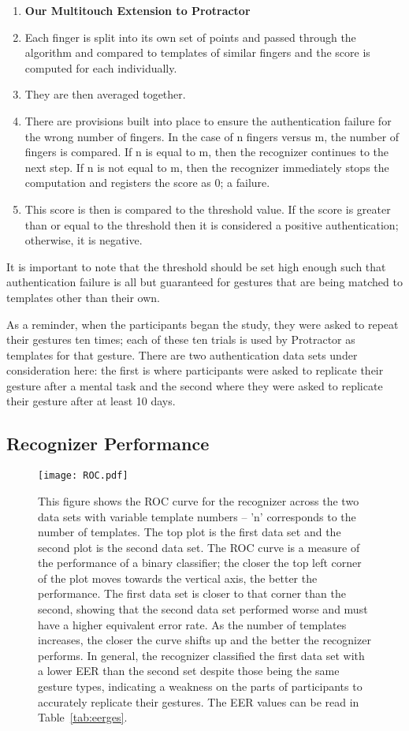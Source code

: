 \documentclass{sig-alternate-10pt}
\begin{document}
\begin{enumerate}
\item[] \textbf{Our Multitouch Extension to Protractor}
\item  Each finger is split into its own set of points and passed through the algorithm and compared to templates of similar fingers and the score is computed for each individually. 
\item They are then averaged together.
\item There are provisions built into place to ensure the authentication failure for the wrong number of fingers. In the case of n fingers versus m, the number of fingers is compared. If n is equal to m, then the recognizer continues to the next step. If n is not equal to m, then the recognizer immediately stops the computation and registers the score as 0; a failure.
\item This score is then  is compared to the threshold value. If the score is greater than or equal to the threshold then it is considered a positive authentication; otherwise, it is negative.
\end{enumerate}
It is important to note that the threshold should be set high enough such that authentication failure is all but guaranteed for gestures that are being matched to templates other than their own.

       As a reminder, when the participants began the study, they were asked to repeat their gestures ten times; each of these ten trials is used by Protractor as templates for that gesture. There are two authentication data sets under consideration here: the first is where participants were asked to replicate their gesture after a mental task and the second where they were asked to replicate their gesture after at least 10 days.



\subsection{Recognizer Performance}


\begin{figure}[t!]

\texttt{[image: ROC.pdf]}
\caption{This figure shows the ROC curve for the recognizer across the two data sets with variable template numbers --   'n' corresponds to the number of templates. The top plot is the first data set and the second plot is the second data set. The ROC curve is a measure of the performance of a binary classifier; the closer the top left corner of the plot moves towards the vertical axis, the better the performance. The first data set is closer to that corner than the second, showing that the second data set performed worse and must have a higher equivalent error rate. As the number of templates increases, the closer the curve shifts up and the better the recognizer performs. In general, the recognizer classified the first data set with a lower EER than the second set despite those being the same gesture types, indicating a weakness on the parts of participants to accurately replicate their gestures. The EER values can be read in Table~\ref{tab:eerges}.}
\label{fig:roc1}
\end{figure}
\end{document}
